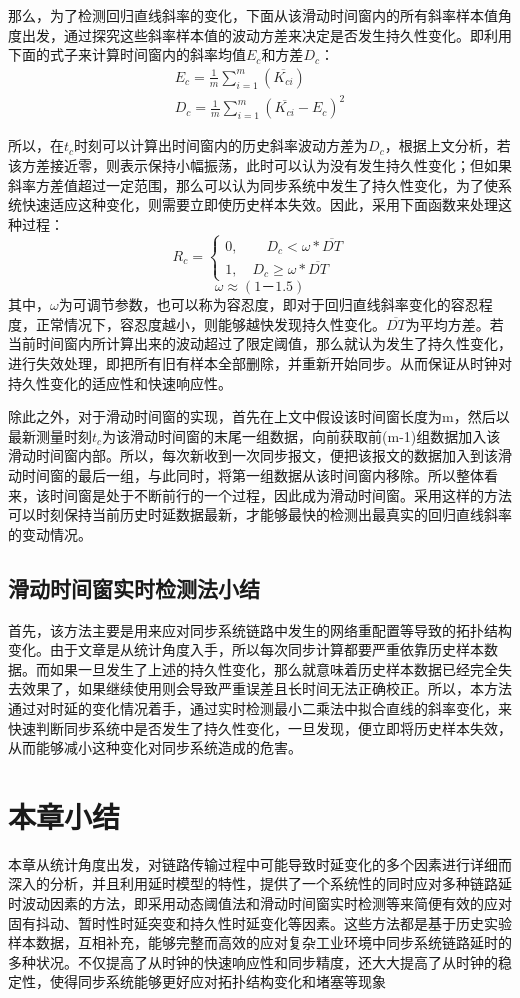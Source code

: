 那么，为了检测回归直线斜率的变化，下面从该滑动时间窗内的所有斜率样本值角度出发，通过探究这些斜率样本值的波动方差来决定是否发生持久性变化。即利用下面的式子来计算时间窗内的斜率均值$E_{c}$和方差$D_{c}$：
\begin{align}
E_{c} = \frac{1}{m}\sum_{i=1}^{m}(\overline{K_{ci}}) \\
D_{c} = \frac{1}{m}\sum_{i=1}^{m}(\overline{K_{ci}} - E_{c}) ^ {2}
\end{align}

所以，在$t_{c}$时刻可以计算出时间窗内的历史斜率波动方差为$D_{c}$，根据上文分析，若该方差接近零，则表示保持小幅振荡，此时可以认为没有发生持久性变化；但如果斜率方差值超过一定范围，那么可以认为同步系统中发生了持久性变化，为了使系统快速适应这种变化，则需要立即使历史样本失效。因此，采用下面函数来处理这种过程：
\begin{equation}
R_{c} = \left\{
	\begin{array}{ll} %
		0, \qquad D_{c} < \omega * \overline{DT} \\
		1, \quad D_{c} \geq \omega * \overline{DT} 
	\end{array}
	\right. 
\end{equation}
\begin{equation}
	\omega \approx (1 － 1.5)
\end{equation}
其中，$\omega$为可调节参数，也可以称为容忍度，即对于回归直线斜率变化的容忍程度，正常情况下，容忍度越小，则能够越快发现持久性变化。$\overline{DT}$为平均方差。若当前时间窗内所计算出来的波动超过了限定阈值，那么就认为发生了持久性变化，进行失效处理，即把所有旧有样本全部删除，并重新开始同步。从而保证从时钟对持久性变化的适应性和快速响应性。

除此之外，对于滑动时间窗的实现，首先在上文中假设该时间窗长度为m，然后以最新测量时刻$t_{c}$为该滑动时间窗的末尾一组数据，向前获取前(m-1)组数据加入该滑动时间窗内部。所以，每次新收到一次同步报文，便把该报文的数据加入到该滑动时间窗的最后一组，与此同时，将第一组数据从该时间窗内移除。所以整体看来，该时间窗是处于不断前行的一个过程，因此成为滑动时间窗。采用这样的方法可以时刻保持当前历史时延数据最新，才能够最快的检测出最真实的回归直线斜率的变动情况。

\subsection{滑动时间窗实时检测法小结}
首先，该方法主要是用来应对同步系统链路中发生的网络重配置等导致的拓扑结构变化。由于文章是从统计角度入手，所以每次同步计算都要严重依靠历史样本数据。而如果一旦发生了上述的持久性变化，那么就意味着历史样本数据已经完全失去效果了，如果继续使用则会导致严重误差且长时间无法正确校正。所以，本方法通过对时延的变化情况着手，通过实时检测最小二乘法中拟合直线的斜率变化，来快速判断同步系统中是否发生了持久性变化，一旦发现，便立即将历史样本失效，从而能够减小这种变化对同步系统造成的危害。

\section{本章小结}
本章从统计角度出发，对链路传输过程中可能导致时延变化的多个因素进行详细而深入的分析，并且利用延时模型的特性，提供了一个系统性的同时应对多种链路延时波动因素的方法，即采用动态阈值法和滑动时间窗实时检测等来简便有效的应对固有抖动、暂时性时延突变和持久性时延变化等因素。这些方法都是基于历史实验样本数据，互相补充，能够完整而高效的应对复杂工业环境中同步系统链路延时的多种状况。不仅提高了从时钟的快速响应性和同步精度，还大大提高了从时钟的稳定性，使得同步系统能够更好应对拓扑结构变化和堵塞等现象
